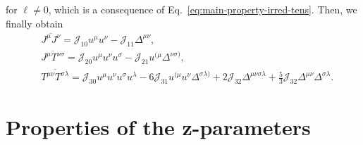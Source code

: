 \documentclass[aps,prd,preprint,nofootinbib,amsmath,amssymb,showpacs,longbibliography,singlecolumn,superscriptaddress,10pt]{revtex4-1}
\theoremstyle{plain}
\theoremstyle{definition}
\begin{document}
%
for $\ell \neq 0$, which is a consequence of Eq.~\eqref{eq:main-property-irred-tens}. Then, we finally obtain
%
\begin{subequations}
\begin{align}
&
\overline{J^\mu J^\nu}= \mathcal{J}_{10} u^{\mu}u^{\nu}
-
\mathcal{J}_{11} \Delta^{\mu \nu},
\\
&
\overline{J^\mu T^{\nu \sigma} } 
=
\mathcal{J}_{20} u^{\mu}u^{\nu}u^{\sigma}
-
\mathcal{J}_{21} u^{(\mu}\Delta^{\nu \sigma)},
\\
&
\overline{T^{\mu \nu} T^{\sigma \lambda} } 
=
\mathcal{J}_{30} u^{\mu}u^{\nu}u^{\sigma} u^{\lambda}
-
6 \mathcal{J}_{31} u^{(\mu} u^{\nu}\Delta^{\sigma \lambda)}
+
2 \mathcal{J}_{32} \Delta^{\mu \nu \sigma \lambda}
+
\frac{5}{3} \mathcal{J}_{32} \Delta^{\mu \nu}\Delta^{\sigma \lambda}.
\end{align}    
\end{subequations}
%


\section{Properties of the z-parameters}\label{thezetaarecosi}
\end{document}
